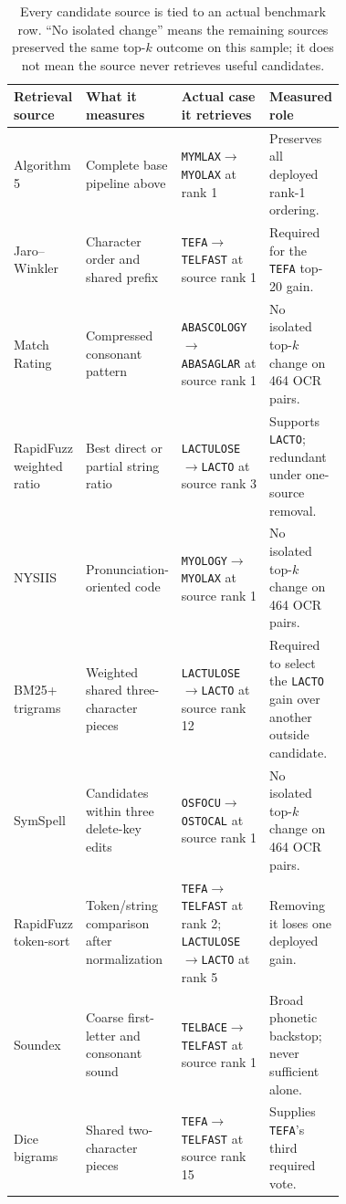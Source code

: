 \documentclass[11pt]{article}
\newcommand{\code}[1]{\texttt{#1}}
\begin{document}
\begin{table}[htbp]
\centering
\small
\begin{tabularx}{\linewidth}{@{}L{0.20\linewidth}L{0.25\linewidth}L{0.27\linewidth}Y@{}}
\toprule
\textbf{Retrieval source} & \textbf{What it measures} & \textbf{Actual case it retrieves} & \textbf{Measured role} \\
\midrule
Algorithm 5 & Complete base pipeline above & \code{MYMLAX}$\rightarrow$\code{MYOLAX} at rank 1 & Preserves all deployed rank-1 ordering. \\
Jaro--Winkler & Character order and shared prefix & \code{TEFA}$\rightarrow$\code{TELFAST} at source rank 1 & Required for the \code{TEFA} top-20 gain. \\
Match Rating & Compressed consonant pattern & \code{ABASCOLOGY}$\rightarrow$\code{ABASAGLAR} at source rank 1 & No isolated top-$k$ change on 464 OCR pairs. \\
RapidFuzz weighted ratio & Best direct or partial string ratio & \code{LACTULOSE}$\rightarrow$\code{LACTO} at source rank 3 & Supports \code{LACTO}; redundant under one-source removal. \\
NYSIIS & Pronunciation-oriented code & \code{MYOLOGY}$\rightarrow$\code{MYOLAX} at source rank 1 & No isolated top-$k$ change on 464 OCR pairs. \\
BM25+ trigrams & Weighted shared three-character pieces & \code{LACTULOSE}$\rightarrow$\code{LACTO} at source rank 12 & Required to select the \code{LACTO} gain over another outside candidate. \\
SymSpell & Candidates within three delete-key edits & \code{OSFOCU}$\rightarrow$\code{OSTOCAL} at source rank 1 & No isolated top-$k$ change on 464 OCR pairs. \\
RapidFuzz token-sort & Token/string comparison after normalization & \code{TEFA}$\rightarrow$\code{TELFAST} at rank 2; \code{LACTULOSE}$\rightarrow$\code{LACTO} at rank 5 & Removing it loses one deployed gain. \\
Soundex & Coarse first-letter and consonant sound & \code{TELBACE}$\rightarrow$\code{TELFAST} at source rank 1 & Broad phonetic backstop; never sufficient alone. \\
Dice bigrams & Shared two-character pieces & \code{TEFA}$\rightarrow$\code{TELFAST} at source rank 15 & Supplies \code{TEFA}'s third required vote. \\
\bottomrule
\end{tabularx}
\caption{Every candidate source is tied to an actual benchmark row. ``No
isolated change'' means the remaining sources preserved the same top-$k$
outcome on this sample; it does not mean the source never retrieves useful
candidates.}
\label{tab:source-evidence}
\end{table}
\end{document}
